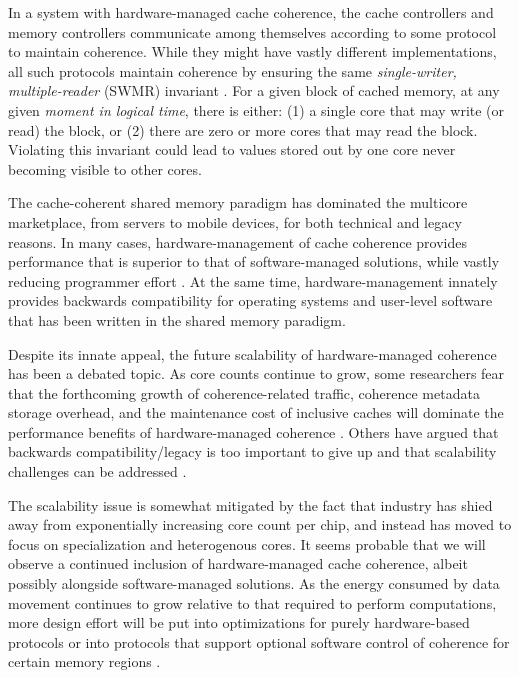In a system with hardware-managed cache coherence, the cache controllers and memory controllers
communicate among themselves according to some protocol to maintain coherence.
While they might have vastly different implementations, 
all such protocols maintain coherence by ensuring the same {\em single-writer, multiple-reader} (SWMR) invariant \cite{sorin2011primer}. 
For a given block of cached memory, at any given {\em moment in logical time}, there is either: 
(1) a single core that may write (or read) the block, or 
(2) there are zero or more cores that may read the block.
Violating this invariant could lead to values stored out by one core never becoming visible to other cores.

The cache-coherent shared memory paradigm has dominated the multicore marketplace, from servers to mobile devices,
for both technical and legacy reasons.
In many cases, hardware-management of cache coherence provides performance that is superior
to that of software-managed solutions, while vastly reducing programmer effort \cite{leverich-isca07}.
At the same time, hardware-management innately provides backwards compatibility for operating systems and user-level software that has been written in the shared memory paradigm.

Despite its innate appeal, the future scalability of hardware-managed coherence has been a debated topic.
As core counts continue to grow, some researchers fear that the forthcoming growth of
coherence-related traffic, coherence metadata storage overhead, and the maintenance cost of inclusive caches
will dominate the performance benefits of hardware-managed coherence
\cite{choi2011denovo, kelm2011cohesion, howard201048}.
Others have argued that backwards compatibility/legacy is too important to give up and that scalability challenges can be addressed \cite{martin2012chip}.

The scalability issue is somewhat mitigated by the fact that industry has shied away from exponentially increasing core count per chip, and instead has moved to focus on specialization and heterogenous cores.
It seems probable that we will observe a continued inclusion of hardware-managed cache coherence, albeit possibly alongside software-managed solutions.
As the energy consumed by data movement continues to grow relative to that required to perform computations, more design effort will be put into optimizations for purely hardware-based protocols
or into protocols that support optional software control of coherence for certain memory regions \cite{kelm2011cohesion}.

